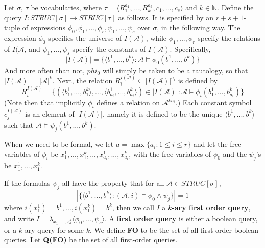 \begin{definition}
	Let $\sigma$, $\tau$ be vocabularies, where $\tau = \langle R_1^{a_1},...,R_k^{a_k},c_1,...,c_s \rangle$ and $k \in \mathbb{N}$. Define the query $I: STRUC[\sigma] \to STRUC[\tau]$ as follows. It is specified by an $r+s+1$-tuple of expressions $\phi_0,\phi_1,...,\phi_r,\psi_1,...,\psi_s$ over $\sigma$, in the following way. The expression $\phi_0$ specifies the universe of $I(\mathcal{A})$, while $\phi_1,...,\phi_r$ specify the relations of $I(\mathcal{A}$, and $\psi_1,...,\psi_s$ specify the constants of $I(\mathcal{A})$. Specifically, 
	\[ |I(\mathcal{A})| = \{\langle b^1,...,b^k \rangle : \mathcal{A} \models \phi_0(b^1,...,b^k)\} \]
And more often than not, $phi_0$ will simply be taken to be a tautology, so that $|I(\mathcal{A})| = |\mathcal{A}|^k$. Next, the relation $R_i^{I(\mathcal{A})} \subseteq |I(\mathcal{A})|^{a_i}$ is defined by
	\[ R_i^{I(\mathcal{A})} = \{ (\langle b_1^1,...,b_1^k \rangle,...,\langle b_{a_i}^1,...,b_{a_i}^k \rangle ) \in |I(\mathcal{A})|: \mathcal{A} \models \phi_i(b_1^1,...,b_{a_i}^k) \} \]  
	(Note then that implicitly $\phi_i$ defines a relation on $\mathcal{A}^{ka_i}$.) 
	Each constant symbol $c_j^{I(\mathcal{A})}$ is an element of $|I(\mathcal{A})|$, namely it is defined to be the unique $\langle b^1,...,b^k \rangle$ such that $\mathcal{A} \models \psi_j(b^1,...,b^k)$. 
	\par When we need to be formal, we let $a = \max\{a_i : 1 \leq i \leq r\}$ and let the free variables of $\phi_i$ be $x_1^1,...,x_1^k,...,x_{a_i}^1,...,x_{a_i}^k$, with the free variables of $\phi_0$ and the $\psi_j$'s be $x_1^1,...,x_1^k$. 
	\par If the formulas $\psi_j$ all have the property that for all $\mathcal{A} \in STRUC[\sigma]$, 
	\[ |\{ \langle b^1,...,b^k \rangle : (\mathcal{A},i) \models \phi_0 \wedge \psi_j \} | = 1 \]
	where $i(x_1^1) = b^1,...,i(x_1^k) = b^k$, then we call $I$ a \textbf{$k$-ary first order query}, and write $I = \lambda_{x_1^1,...,x_a^k}\langle \phi_0,...,\psi_s \rangle$. A \textbf{first order query} is either a boolean query, or a $k$-ary query for some $k$. We define \textbf{FO} to be the set of all first order boolean queries. Let \textbf{Q(FO)} be the set of all first-order queries. 
\end{definition}

